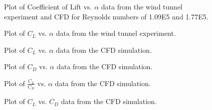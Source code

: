 \documentclass[
	12pt, %
]{fluids_report_style}
\begin{document}





\begin{figure}[H]%
    \centering
    {{ }}%
    \caption{Plot of Coefficient of Lift vs. $\alpha$ data from the wind tunnel experiment and CFD for Reynolds numbers of 1.09E5 and 1.77E5.}
    \label{fig:C_L_vs_alpha_Wt_CFD}%
\end{figure}  

\begin{figure}[H]%
    \centering
    {{ }}%
    \caption{Plot of $C_L$ vs. $\alpha$ data from the wind tunnel experiment.}
    \label{fig:C_L_vs_alpha_Wt}%
\end{figure}  

\begin{figure}[H]%
    \centering
    {{ }}%
    \caption{Plot of $C_L$ vs. $\alpha$ data from the CFD simulation.}
    \label{fig:C_L_vs_alpha_CFD}%
\end{figure}  

\begin{figure}[H]%
    \centering
    {{ }}%
    \caption{Plot of $C_D$ vs. $\alpha$ data from the CFD simulation.}
    \label{fig:C_D_vs_alpha}%
\end{figure}  

\begin{figure}[H]%
    \centering
    {{ }}%
    \caption{Plot of $\frac{C_L}{C_D}$ vs. $\alpha$ data from the CFD simulation.}
    \label{fig:C_L_C_D_vs_alpha}%
\end{figure}  

\begin{figure}[H]%
    \centering
    {{ }}%
    \caption{Plot of $C_L$ vs. $C_D$ data from the CFD simulation.}
    \label{fig:C_L_vs_C_D}%
\end{figure}  
\end{document}

